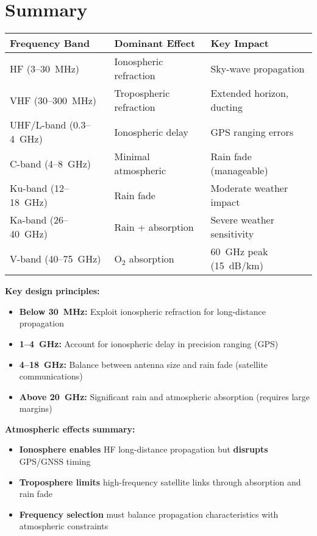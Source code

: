 \section{Summary}

\begin{center}
\begin{tabular}{@{}lll@{}}
\toprule
\textbf{Frequency Band} & \textbf{Dominant Effect} & \textbf{Key Impact} \\
\midrule
HF (3--30~MHz) & Ionospheric refraction & Sky-wave propagation \\
VHF (30--300~MHz) & Tropospheric refraction & Extended horizon, ducting \\
UHF/L-band (0.3--4~GHz) & Ionospheric delay & GPS ranging errors \\
C-band (4--8~GHz) & Minimal atmospheric & Rain fade (manageable) \\
Ku-band (12--18~GHz) & Rain fade & Moderate weather impact \\
Ka-band (26--40~GHz) & Rain + absorption & Severe weather sensitivity \\
V-band (40--75~GHz) & O$_2$ absorption & 60~GHz peak (15~dB/km) \\
\bottomrule
\end{tabular}
\end{center}

\textbf{Key design principles:}
\begin{itemize}
\item \textbf{Below 30~MHz:} Exploit ionospheric refraction for long-distance propagation
\item \textbf{1--4~GHz:} Account for ionospheric delay in precision ranging (GPS)
\item \textbf{4--18~GHz:} Balance between antenna size and rain fade (satellite communications)
\item \textbf{Above 20~GHz:} Significant rain and atmospheric absorption (requires large margins)
\end{itemize}

\textbf{Atmospheric effects summary:}
\begin{itemize}
\item \textbf{Ionosphere enables} HF long-distance propagation but \textbf{disrupts} GPS/GNSS timing
\item \textbf{Troposphere limits} high-frequency satellite links through absorption and rain fade
\item \textbf{Frequency selection} must balance propagation characteristics with atmospheric constraints
\end{itemize}

